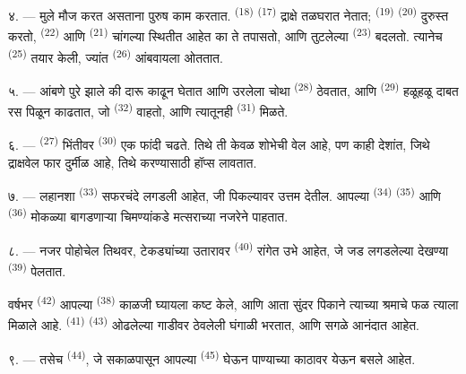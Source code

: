 ४. --- मुले मौज करत असताना पुरुष काम करतात.  \textsuperscript{(18)}
 \textsuperscript{(17)} द्राक्षे तळघरात नेतात;
 \textsuperscript{(19)}  \textsuperscript{(20)} दुरुस्त
करतो,  \textsuperscript{(22)} आणि  \textsuperscript{(21)} चांगल्या
स्थितीत आहेत का ते तपासतो, आणि तुटलेल्या  \textsuperscript{(23)} बदलतो.
त्यानेच  \textsuperscript{(25)} तयार केली, ज्यांत 
\textsuperscript{(26)} आंबवायला ओततात.

५. --- आंबणे पुरे झाले की दारू काढून घेतात आणि उरलेला चोथा 
\textsuperscript{(28)} ठेवतात, आणि  \textsuperscript{(29)} हळूहळू दाबत
रस पिळून काढतात, जो  \textsuperscript{(32)} वाहतो, आणि त्यातूनही 
\textsuperscript{(31)} मिळते.

\VUsaut{6.0mm}
\VUsaut{3.4mm}

६. ---  \textsuperscript{(27)} भिंतीवर 
\textsuperscript{(30)} एक फांदी चढते. तिथे ती केवळ शोभेची वेल आहे, पण काही देशांत, जिथे
द्राक्षवेल फार दुर्मीळ आहे, तिथे  करण्यासाठी हॉप्स लावतात.

७. --- लहानशा  \textsuperscript{(33)} सफरचंदे लगडली आहेत, जी
पिकल्यावर उत्तम  देतील. आपल्या  \textsuperscript{(34)}
 \textsuperscript{(35)} आणि  \textsuperscript{(36)} मोकळ्या
बागडणाऱ्या चिमण्यांकडे मत्सराच्या नजरेने पाहतात.

८. --- नजर पोहोचेल तिथवर, टेकड्यांच्या उतारावर  \textsuperscript{(40)}
रांगेत उभे आहेत, जे जड  लगडलेल्या देखण्या  \textsuperscript{(39)}
पेलतात.

वर्षभर  \textsuperscript{(42)} आपल्या 
\textsuperscript{(38)} काळजी घ्यायला कष्ट केले, आणि आता सुंदर पिकाने त्याच्या श्रमाचे फळ
त्याला मिळाले आहे.  \textsuperscript{(41)} 
\textsuperscript{(43)} ओढलेल्या गाडीवर ठेवलेली घंगाळी भरतात, आणि सगळे आनंदात आहेत.

\VUsaut{5.0mm}
\VUsaut{3.4mm}

९. --- तसेच  \textsuperscript{(44)}, जे सकाळपासून आपल्या
 \textsuperscript{(45)} घेऊन पाण्याच्या काठावर येऊन बसले आहेत.


